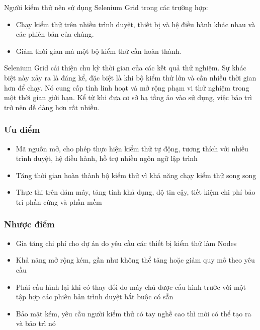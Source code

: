\documentclass[./../main_file.tex]{subfiles}
\begin{document}
	Người kiểm thử nên sử dụng Selenium Grid trong các trường hợp:
	
	\begin{itemize}
		\item Chạy kiểm thử trên nhiều trình duyệt, thiết bị và hệ điều hành khác nhau và các phiên bản của chúng.
		\item Giảm thời gian mà một bộ kiểm thử cần hoàn thành.
	\end{itemize}
	
	Selenium Grid cải thiện chu kỳ thời gian của các kết quả thử nghiệm. Sự khác biệt này xảy ra là đáng kể, đặc biệt là khi bộ kiểm thử lớn và cần nhiều thời gian hơn để chạy. Nó cung cấp tính linh hoạt và mở rộng phạm vi thử nghiệm trong một thời gian giới hạn. Kể từ khi đưa cơ sở hạ tầng ảo vào sử dụng, việc bảo trì trở nên dễ dàng hơn rất nhiều.

	\subsubsection{Ưu điểm}
	
	\begin{itemize}
		\item Mã nguồn mở, cho phép thực hiện kiểm thử tự động, tương thích với nhiều trình duyệt, hệ điều hành, hỗ trợ nhiều ngôn ngữ lập trình
		\item Tăng thời gian hoàn thành bộ kiểm thử vì khả năng chạy kiểm thử song song
		\item Thực thi trên đám mây, tăng tính khả dụng, độ tin cậy, tiết kiệm chi phí bảo trì phần cứng và phần mềm
	\end{itemize}
	
	\subsubsection{Nhược điểm}
	
	\begin{itemize}
		\item Gia tăng chi phí cho dự án do yêu cầu các thiết bị kiểm thử làm Nodes
		\item Khả năng mở rộng kém, gần như không thể tăng hoặc giảm quy mô theo yêu cầu
		\item Phải cấu hình lại khi có thay đổi do máy chủ được cấu hình trước với một tập hợp các phiên bản trình duyệt bắt buộc có sẵn
		\item Bảo mật kém, yêu cầu người kiểm thử có tay nghề cao thì mới có thể tạo ra và bảo trì nó
	\end{itemize}
	
\end{document}
